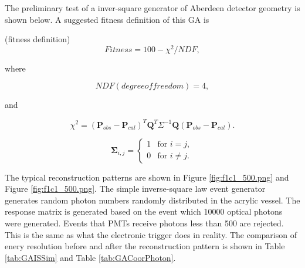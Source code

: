 The preliminary test of a inver-square generator of Aberdeen
detector geometry is shown below. A suggested fitness definition of this GA is


(fitness definition)
\begin{equation}
\label{fitness}
Fitness = 100 - \chi^{2}/NDF,
\end{equation}


where


\begin{equation}
\label{eq:fitnessNDF}
NDF(degree of freedom) = 4,
\end{equation}


and


\begin{equation}
\label{eq:fitnessChi}
\chi^{2} = (\mathbf{P}_{obs} - \mathbf{P}_{cal})^T\mathbf{Q}^T\Sigma^{-1}\mathbf{Q}(\mathbf{P}_{obs} - \mathbf{P}_{cal}).
\end{equation}



\begin{equation}
\label{eq:covariance1}
\mathbf{\Sigma}_{i,j} =
\left\{
    \begin{array}{ll}
    1 & \mbox{for } i=j, \\
    0 & \mbox{for } i{\neq}j.
    \end{array} \right.
\end{equation}



%
%
%
%
%
%

The typical reconstruction patterns are shown in Figure \ref{fig:f1c1_500.png} and Figure \ref{fig:f1c1_500.png}.
The simple inverse-square law event generator generates random photon numbers randomly distributed in the acrylic vessel.
The response matrix is generated based on the event which 10000 optical photons were generated.
Events that PMTs receive photons less than 500 are rejected. This is the same as what the electronic trigger does in reality.
The comparison of enery resolution before and after the reconstruction pattern is shown in Table \ref{tab:GAISSim} and Table \ref{tab:GACoorPhoton}.



